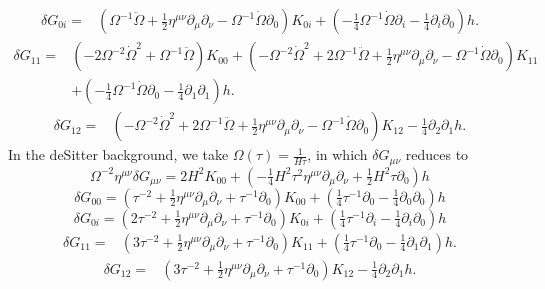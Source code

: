 \documentclass[10pt,letterpaper]{article}
\begin{document}
\begin{align}
\delta G_{0i}={}&(\Omega^{-1} \ddot{\Omega}
 + \tfrac{1}{2} \eta^{\mu \nu} \partial_{\mu} \partial_{\nu}
 -  \Omega^{-1} \dot{\Omega} \partial_{0}) K_{0i}
 + (- \tfrac{1}{4} \Omega^{-1} \dot{\Omega} \partial_{i}
 -  \tfrac{1}{4} \partial_{i} \partial_{0}) h.
\end{align}
\begin{align}
\delta G_{11}={}&(-2 \Omega^{-2} \dot{\Omega}^2
 + \Omega^{-1} \ddot{\Omega}) K_{00}
 + (- \Omega^{-2} \dot{\Omega}^2
 + 2 \Omega^{-1} \ddot{\Omega}
 + \tfrac{1}{2} \eta^{\mu \nu} \partial_{\mu} \partial_{\nu}
 -  \Omega^{-1} \dot{\Omega} \partial_{0}) K_{11}\nonumber\\
& + (- \tfrac{1}{4} \Omega^{-1} \dot{\Omega} \partial_{0}
 -  \tfrac{1}{4} \partial_{1} \partial_{1}) h.
\end{align}
\begin{align}
\delta G_{12}={}&(- \Omega^{-2} \dot{\Omega}^2
 + 2 \Omega^{-1} \ddot{\Omega}
 + \tfrac{1}{2} \eta^{\mu \nu} \partial_{\mu} \partial_{\nu}
 -  \Omega^{-1} \dot{\Omega} \partial_{0}) K_{12}
 -  \tfrac{1}{4} \partial_{2} \partial_{1} h.
\end{align}
In the deSitter background, we take $\Omega(\tau) = \frac{1}{H\tau}$, in which $\delta G_{\mu\nu}$ reduces to 
\begin{equation}
	\Omega^{-2}\eta^{\mu\nu}\delta G_{\mu\nu}
=2 H^2 K_{00} + (- \tfrac{1}{4} H^2 \tau^2 \eta^{\mu \nu} \partial_{\mu} \partial_{\nu} + \tfrac{1}{2} H^2 \tau \partial_{0}) h
\end{equation}
\begin{equation}
\delta G_{00}=
(\tau^{-2} + \tfrac{1}{2} \eta^{\mu \nu} \partial_{\mu} \partial_{\nu} + \tau^{-1} \partial_{0}) K_{00} + (\tfrac{1}{4} \tau^{-1} \partial_{0} -  \tfrac{1}{4} \partial_{0} \partial_{0}) h
\end{equation}
\begin{equation}
\delta G_{0i}=
(2 \tau^{-2} + \tfrac{1}{2} \eta^{\mu \nu} \partial_{\mu} \partial_{\nu} + \tau^{-1} \partial_{0}) K_{0i} + (\tfrac{1}{4} \tau^{-1} \partial_{i} -  \tfrac{1}{4} \partial_{i} \partial_{0}) h
\end{equation}
\begin{align}
\delta G_{11}={}&(3 \tau^{-2}
 + \tfrac{1}{2} \eta^{\mu \nu} \partial_{\mu} \partial_{\nu}
 + \tau^{-1} \partial_{0}) K_{11}
 + (\tfrac{1}{4} \tau^{-1} \partial_{0}
 -  \tfrac{1}{4} \partial_{1} \partial_{1}) h.
\end{align}
\begin{align}
\delta G_{12}={}&(3 \tau^{-2}
 + \tfrac{1}{2} \eta^{\mu \nu} \partial_{\mu} \partial_{\nu}
 + \tau^{-1} \partial_{0}) K_{12}
 -  \tfrac{1}{4} \partial_{2} \partial_{1} h.
\end{align}
\end{document}
